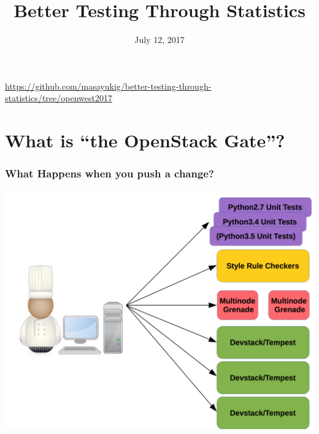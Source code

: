 \documentclass[aspectratio=169,11pt,hyperref={colorlinks=true}]{beamer}
\author[Matthew Treinish & Masayuki Igawa]{%
    \texorpdfstring{%
        \begin{columns}
            \column{.45\linewidth}
            \centering
            Matthew Treinish\\
            Open Source Developer Advocate\\ IBM\\
            \href{mailto:mtreinish@kortar.org}{mtreinish@kortar.org}\\
        \texttt{mtreinish on Freenode}
        \column{.45\linewidth}
            \centering
            Masayuki Igawa\\
            \href{mailto:masayuki.igawa@gmail.com}{masayuki.igawa@gmail.com}\\
            \texttt{masayukig on Freenode}
        \end{columns}
        }
    {Matthew Treinish & Masayuki Igawa}
}
\date{July 12, 2017}
\title[Better Testing Through Statistics
\hspace{2em}\insertframenumber/\inserttotalframenumber]{Better Testing Through Statistics}
\begin{document}
{%
\begin{frame}[noframenumbering]
    \hypersetup{colorlinks,urlcolor=white}
    \titlepage{}
    \centering
    \href{https://github.com/masayukig/better-testing-through-statistics/tree/openwest2017}{https://github.com/masayukig/better-testing-through-statistics/tree/openwest2017}
\end{frame}
}

\section{What is ``the OpenStack Gate''?}
\begin{frame}
\frametitle{What Happens when you push a change?}
\begin{center}
	\includegraphics[width=.7\textwidth]{jobs.png}
\end{center}
\end{frame}
\end{document}
